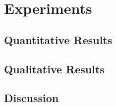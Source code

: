 
\chapter{Experiments}\label{chapter:introduction}
\section{Quantitative Results}
\section{Qualitative Results}
\section{Discussion}
